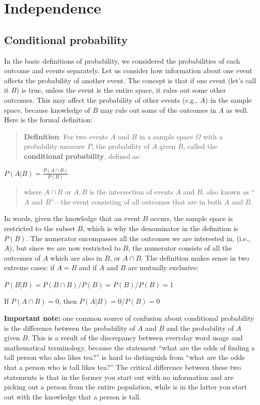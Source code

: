 \documentclass[
  letterpaper,
  DIV=11,
  numbers=noendperiod]{scrreprt}
\begin{document}
\section{Independence}\label{independence}

\subsection{Conditional probability}\label{conditional-probability}

In the basic definitions of probability, we considered the probabilities
of each outcome and events separately. Let us consider how information
about one event affects the probability of another event. The concept is
that if one event (let's call it \(B\)) is true, unless the event is the
entire space, it rules out some other outcomes. This may affect the
probability of other events (e.g., \(A\)) in the sample space, because
knowledge of \(B\) may rule out some of the outcomes in \(A\) as well.
Here is the formal definition:

\begin{quote}
\textbf{Definition}: For two events \(A\) and \(B\) in a sample space
\(\Omega\) with a probability measure \(P\), the probability of \(A\)
given \(B\), called the \textbf{conditional probability}, defined as:
\end{quote}

\(P(A \vert B) = \frac{P(A \cap B)}{P(B)}\)

\begin{quote}
where \(A \cap B\) or \(A, B\) is the intersection of events \(A\) and
\(B\), also known as ``\(A\) and \(B\)''---the event consisting of all
outcomes that are in both \(A\) and \(B\).
\end{quote}

In words, given the knowledge that an event \(B\) occurs, the sample
space is restricted to the subset \(B\), which is why the denominator in
the definition is \(P(B)\). The numerator encompasses all the outcomes
we are interested in, (i.e., \(A\)), but since we are now restricted to
\(B\), the numerator consists of all the outcomes of \(A\) which are
also in \(B\), or \(A \cap B\). The definition makes sense in two
extreme cases: if \(A = B\) and if \(A\) and \(B\) are mutually
exclusive:

\(P(B\vert B) = P(B \cap B) /P(B) = P(B)/P(B) = 1\)

If \(P(A\cap B) = 0\), then \(P(A\vert B) = 0/P(B) = 0\)

\textbf{Important note:} one common source of confusion about
conditional probability is the difference between the probability of
\(A\) and \(B\) and the probability of \(A\) given \(B\). This is a
result of the discrepancy between everyday word usage and mathematical
terminology, because the statement ``what are the odds of finding a tall
person who also likes tea?'' is hard to distinguish from ``what are the
odds that a person who is tall likes tea?'' The critical difference
between these two statements is that in the former you start out with no
information and are picking out a person from the entire population,
while is in the latter you start out with the knowledge that a person is
tall.
\end{document}
